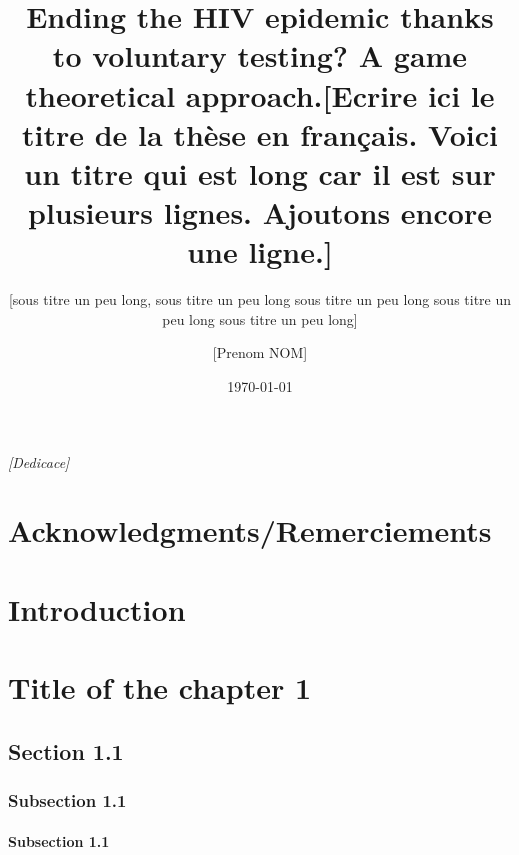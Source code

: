 \documentclass[11pt,a4paper,twoside]{book}
\author{[Prenom NOM]}
\title{\LARGE{Ending the HIV epidemic thanks to voluntary testing? A game theoretical approach.}}
\title{[Ecrire ici le titre de la thèse en français.
	 Voici un titre qui est long car il est sur plusieurs lignes. Ajoutons encore une ligne.]}
\subtitle{[sous titre un peu long, sous titre un peu long  sous titre un peu long  sous titre un peu long  sous titre un peu long]}
\date{\today}
\makeatletter
\renewcommand*{\cleardoublepage}{\clearpage\if@twoside \ifodd\c@page\else
	\hbox{}%
	\thispagestyle{empty}%
	\newpage%
	\if@twocolumn\hbox{}\newpage\fi\fi\fi} %
\makeatother
\begin{document}
	
	
	\makeatother %
	
	\cleardoublepage 
	\thispagestyle{empty} %
	\vspace*{5cm}
	\null\hfill\textit{[Dedicace]}

	
	\cleardoublepage
	
	\chapter*{Acknowledgments/Remerciements} 
	\thispagestyle{plain} %
	\lipsum[1-3]
	\cleardoublepage
	
	\dominitoc %
	\tableofcontents %
	\cleardoublepage

	
	\chapter*{Introduction}
	\lipsum[1-5]
	\thispagestyle{plain} %
	
	\adjustmtc %
	
	\chapter{Title of the chapter 1}
	\minitoc %
	\section{Section 1.1}
	\subsection{Subsection 1.1}
	\subsubsection{Subsection 1.1}
\end{document}
